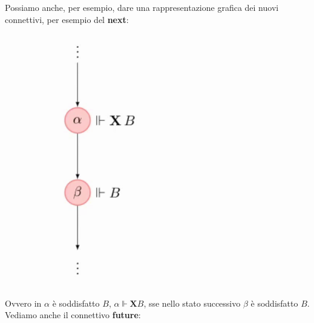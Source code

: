 \documentclass[a4paper,12pt, oneside]{book}
\begin{document}
\begin{esempio}
  Possiamo anche, per esempio, dare una rappresentazione grafica dei nuovi
  connettivi, per esempio del \textbf{next}:
  \begin{figure}[H]
    \centering
    \includegraphics[scale = 0.4]{img/pltl2.png}
  \end{figure}
  Ovvero in $\alpha$ è soddisfatto $B$, $\alpha\Vdash\mathbf{X}B$, sse nello
  stato successivo $\beta$ è soddisfatto $B$.\\
  Vediamo anche il connettivo \textbf{future}:
  \begin{figure}[H]
    \centering

\end{figure}
\end{esempio}
\end{document}
